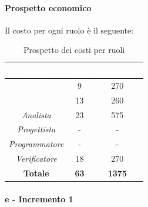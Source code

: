\paragraph*{Prospetto economico}
Il costo per ogni ruolo è il seguente:
\begin{table}[H]
	\begin{center}
		\begin{tabular}{ |c c c| }
			\rowcolor{darkblue} 
			\textcolor{white}{\textbf{Ruolo}} & \textcolor{white}{\textbf{Ore}} & \textcolor{white}{\textbf{Costo in €}}\\ \hline
			{\Responsabile} 			& 9 & 270 \\ \hline
			{\Amministratore} 			& 13 & 260 \\ \hline
			\textit{Analista} 			& 23 & 575 \\ \hline
			\textit{Progettista} 		& - & - \\ \hline
			\textit{Programmatore}  	& - & - \\ \hline
			\textit{Verificatore} 		& 18 & 270 \\ \hline
			\textbf{Totale} & \textbf{63} & \textbf{1375} \\ \hline
		\end{tabular}
		\caption{Prospetto dei costi per ruoli}
	\end{center}
\end{table}

\paragraph{ e - Incremento 1}
